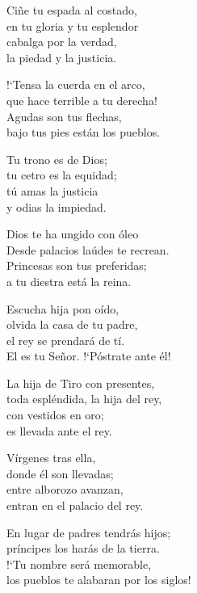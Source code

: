 \documentclass[12pt, letterpaper]{report}
\begin{document}
    \noindent
    Ci\~ne tu espada al costado,\\
    en tu gloria y tu esplendor\\
    cabalga por la verdad,\\
    la piedad y la justicia.

    \noindent
    !`Tensa la cuerda en el arco,\\
    que hace terrible a tu derecha!\\
    Agudas son tus flechas,\\
    bajo tus pies est\'an los pueblos.

    \noindent
    Tu trono es de Dios;\\
    tu cetro es la equidad;\\
    t\'u amas la justicia\\
    y odias la impiedad.

    \noindent
    Dios te ha ungido con \'oleo\\
    Desde palacios la\'udes te recrean.\\
    Princesas son tus preferidas;\\
    a tu diestra est\'a la reina.

    \noindent
    Escucha hija pon o\'ido,\\
    olvida la casa de tu padre,\\
    el rey se prendar\'a de t\'i.\\
    El es tu Se\~nor. !`P\'ostrate ante \'el!

    \noindent
    La hija de Tiro con presentes,\\
    toda espl\'endida, la hija del rey,\\
    con vestidos en oro;\\
    es llevada ante el rey.

    \noindent
    V\'irgenes tras ella,\\
    donde \'el son llevadas;\\
    entre alborozo avanzan,\\
    entran en el palacio del rey.

    \noindent
    En lugar de padres tendr\'as hijos;\\
    pr\'incipes los har\'as de la tierra.\\
    !`Tu nombre ser\'a memorable,\\
    los pueblos te alabaran por los siglos!
    \clearpage




\end{document}
